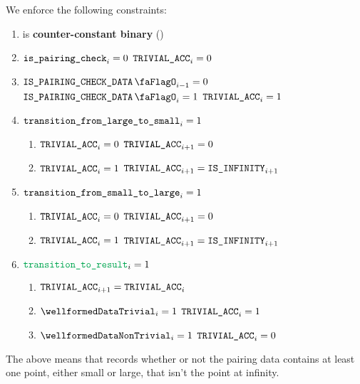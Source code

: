 
We enforce the following constraints:
\begin{enumerate}
    \item \trivialAcc{} is \textbf{counter-constant binary} \quad (\trash)
    \item \If $\texttt{is\_pairing\_check} _{i} = 0$ \Then $\texttt{TRIVIAL\_ACC} _{i} = 0$
    \item \If $\isBlsPairingCheckData_{i - 1} = 0$ \et $\isBlsPairingCheckData _{i} = 1$ \Then $\texttt{TRIVIAL\_ACC}_{i} = 1$
    \item \If $\texttt{transition\_from\_large\_to\_small}_{i} = 1$ \Then 
          \begin{enumerate}
              \item \If $\texttt{TRIVIAL\_ACC} _{i} = 0$ \Then $\texttt{TRIVIAL\_ACC} _{i + 1} = 0$
              \item \If $\texttt{TRIVIAL\_ACC} _{i} = 1$ \Then $\texttt{TRIVIAL\_ACC} _{i + 1} = \texttt{IS\_INFINITY}_{i + 1}$
          \end{enumerate}
    \item \If $\texttt{transition\_from\_small\_to\_large}_{i} = 1$ \Then
          \begin{enumerate}
              \item \If $\texttt{TRIVIAL\_ACC} _{i} = 0$ \Then $\texttt{TRIVIAL\_ACC} _{i + 1} = 0$
              \item \If $\texttt{TRIVIAL\_ACC} _{i} = 1$ \Then $\texttt{TRIVIAL\_ACC} _{i + 1} = \texttt{IS\_INFINITY}_{i + 1}$
          \end{enumerate}
    \item \If $\locTransitionToResult_{i} = 1$ \Then 
    \begin{enumerate}
        \item $\texttt{TRIVIAL\_ACC}_{i+1} = \texttt{TRIVIAL\_ACC}_{i}$
        \item \If $\wellformedDataTrivial_{i} = 1$ \Then $\texttt{TRIVIAL\_ACC}_{i} = 1$
        \item \If $\wellformedDataNonTrivial_{i} = 1$ \Then $\texttt{TRIVIAL\_ACC}_{i} = 0$
    \end{enumerate} 
\end{enumerate}
\saNote{} The above means that \trivialAcc{} records whether or not the pairing data contains at least one point, either small or large, that isn't the point at infinity.

